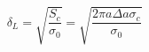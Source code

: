 \begin{equation}
     \delta_L = \sqrt{\frac{S_c}{\sigma_0}} = \sqrt{\frac{2\pi a \Delta a \sigma_c}{\sigma_0}}
\label{eq:conduction_length}
\end{equation}

